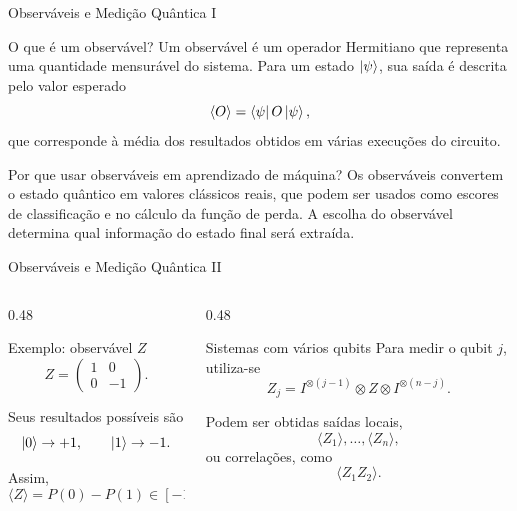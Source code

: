 \begin{frame}{Observáveis e Medição Quântica I}

\begin{block}{O que é um observável?}
Um observável é um operador Hermitiano que representa uma quantidade
mensurável do sistema. Para um estado $\ket{\psi}$, sua saída é descrita
pelo valor esperado
\[
  \langle O\rangle
  =
  \bra{\psi}O\ket{\psi},
\]
que corresponde à média dos resultados obtidos em várias execuções do
circuito.
\end{block}

\vspace{0.2cm}

\begin{alertblock}{Por que usar observáveis em aprendizado de máquina?}
Os observáveis convertem o estado quântico em valores clássicos reais,
que podem ser usados como escores de classificação e no cálculo da função
de perda. A escolha do observável determina qual informação do estado
final será extraída.
\end{alertblock}

\end{frame}

\begin{frame}{Observáveis e Medição Quântica II}
\begin{columns}[T,onlytextwidth]

\begin{column}{0.48\textwidth}
\begin{block}{Exemplo: observável $Z$}
\[
  Z=
  \begin{pmatrix}
    1&0\\
    0&-1
  \end{pmatrix}.
\]

Seus resultados possíveis são
\[
  \ket{0}\rightarrow +1,
  \qquad
  \ket{1}\rightarrow -1.
\]

Assim,
\[
  \langle Z\rangle
  =
  P(0)-P(1)
  \in[-1,1].
\]
\end{block}
\end{column}

\begin{column}{0.48\textwidth}
\begin{block}{Sistemas com vários qubits}
Para medir o qubit $j$, utiliza-se
\[
  Z_j
  =
  I^{\otimes(j-1)}
  \otimes Z
  \otimes I^{\otimes(n-j)}.
\]

Podem ser obtidas saídas locais,
\[
  \langle Z_1\rangle,\ldots,\langle Z_n\rangle,
\]
ou correlações, como
\[
  \langle Z_1Z_2\rangle.
\]
\end{block}
\end{column}

\end{columns}

\end{frame}

